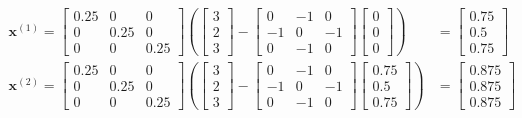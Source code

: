 \documentclass[]{article}
\begin{document}
\begin{align*}
    \mathbf{x}^{(1)} = \begin{bmatrix}
        0.25 & 0 & 0\\
        0 & 0.25 & 0\\
        0 & 0 & 0.25
    \end{bmatrix} \left(\begin{bmatrix}
        3\\
        2\\
        3
    \end{bmatrix} - \begin{bmatrix}
        0 & -1 & 0\\
        -1 & 0 & -1\\
        0 & -1 & 0
    \end{bmatrix}\begin{bmatrix}
        0\\
        0\\
        0
    \end{bmatrix}\right)
    &=
    \begin{bmatrix}
        0.75\\
        0.5\\
        0.75
    \end{bmatrix}\\
    \mathbf{x}^{(2)} = \begin{bmatrix}
        0.25 & 0 & 0\\
        0 & 0.25 & 0\\
        0 & 0 & 0.25
    \end{bmatrix} \left(\begin{bmatrix}
        3\\
        2\\
        3
    \end{bmatrix} - \begin{bmatrix}
        0 & -1 & 0\\
        -1 & 0 & -1\\
        0 & -1 & 0
    \end{bmatrix}\begin{bmatrix}
        0.75\\
        0.5\\
        0.75
    \end{bmatrix}\right)
    &=
    \begin{bmatrix}
        0.875\\
        0.875\\
        0.875
    \end{bmatrix}\\

\end{align*}
\end{document}
